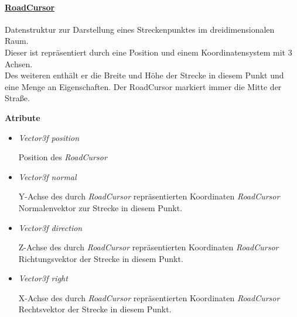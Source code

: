         \paragraph{\underline{RoadCursor}} \mbox{}\par
            Datenstruktur zur Darstellung eines Streckenpunktes im dreidimensionalen Raum.\\
            Dieser ist repräsentiert durch eine Position und einem Koordinatensystem mit 3 Achsen.\\
            Des weiteren enthält er die Breite und Höhe der Strecke in diesem Punkt und eine Menge an Eigenschaften.
            Der RoadCursor markiert immer die Mitte der Straße.
            \par

            \textbf{Atribute}
            \begin{itemize}

                \item  \textit{Vector3f position}
                    \begin{leftbar}[0.9\linewidth]
                        Position des \textit{RoadCursor}
                    \end{leftbar}
                
                \item  \textit{Vector3f normal}
                    \begin{leftbar}[0.9\linewidth]
                        Y-Achse des durch \textit{RoadCursor} repräsentierten Koordinaten \textit{RoadCursor}\\
                        Normalenvektor zur Strecke in diesem Punkt.
                    \end{leftbar}

                \item  \textit{Vector3f direction}
                    \begin{leftbar}[0.9\linewidth]
                        Z-Achse des durch \textit{RoadCursor} repräsentierten Koordinaten \textit{RoadCursor}\\
                        Richtungsvektor der Strecke in diesem Punkt.
                    \end{leftbar}

                \item  \textit{Vector3f right}
                    \begin{leftbar}[0.9\linewidth]
                        X-Achse des durch \textit{RoadCursor} repräsentierten Koordinaten \textit{RoadCursor}\\
                        Rechtsvektor der Strecke in diesem Punkt.
                    \end{leftbar}
                

\end{itemize}
